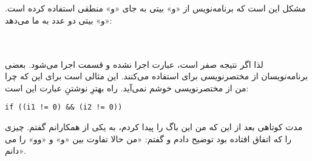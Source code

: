 \section{}
\paragraph{}\label{answer:17}
مشکل این است که برنامه‌نویس از «و» بیتی \lr{\texttt{(\&)}} به جای «و» منطقی \lr{\texttt{(\&\&)}} استفاده کرده است. «و» بیتی دو عدد به ما می‌دهد:
\LTR\noindent
{}\\
\\
\lr{\texttt{|=========}}\\

\RTL
لذا اگر نتیجه صفر است، عبارت  اجرا نشده و قسمت  اجرا می‌شود. بعضی برنامه‌نویسان از مختصرنویسی  برای  استفاده می‌کنند. این مثالی است برای این که چرا من از مختصرنویسی خوشم نمی‌آید. راه بهترِ نوشتنِ عبارت  این است:
\begin{LTR}
        \begin{lstlisting}[style=C++Style]
              if ((i1 != 0) && (i2 != 0))
        \end{lstlisting}
\end{LTR}

مدت کوتاهی بعد از این که من این باگ را پیدا کردم، به یکی از همکارانم گفتم. چیزی را که اتفاق افتاده بود توضیح دادم و گفتم: «من حالا تفاوت بین «و» و «وو» را می دانم».